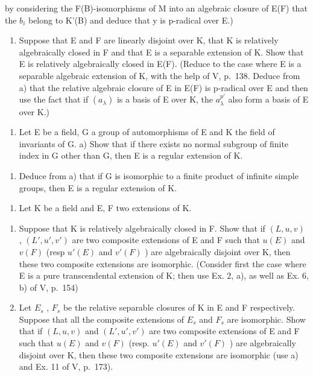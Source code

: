 by considering the F(B)-isomorphisms of M into an algebraic closure of E(F) that the \(b_{i}\) belong to K'(B) and deduce that y is p-radical over E.)

\begin{enumerate}
\def\labelenumi{\alph{enumi})}
\setcounter{enumi}{1}
\tightlist
\item
  Suppose that E and F are linearly disjoint over K, that K is relatively algebraically closed in F and that E is a separable extension of K. Show that E is relatively algebraically closed in E(F). (Reduce to the case where E is a separable algebraic extension of K, with the help of V, p.~138. Deduce from a) that the relative algebraic closure of E in E(F) is p-radical over E and then use the fact that if \((a_{\lambda})\) is a basis of E over K, the \(a_{\lambda}^{p'}\) also form a basis of E over K.)
\end{enumerate}

\begin{enumerate}
\def\labelenumi{\arabic{enumi})}
\setcounter{enumi}{2}
\tightlist
\item
  Let E be a field, G a group of automorphisms of E and K the field of invariants of G. a) Show that if there exists no normal subgroup of finite index in G other than G, then E is a regular extension of K.
\end{enumerate}

\begin{enumerate}
\def\labelenumi{\alph{enumi})}
\setcounter{enumi}{1}
\tightlist
\item
  Deduce from a) that if G is isomorphic to a finite product of infinite simple groups, then E is a regular extension of K.
\end{enumerate}

\begin{enumerate}
\def\labelenumi{\arabic{enumi})}
\setcounter{enumi}{3}
\tightlist
\item
  Let K be a field and E, F two extensions of K.
\end{enumerate}

\begin{enumerate}
\def\labelenumi{\alph{enumi})}
\item
  Suppose that K is relatively algebraically closed in F. Show that if \((L, u, v)\) , \((L', u', v')\) are two composite extensions of E and F such that \(u(E)\) and \(v(F)\) (resp \(u'(E)\) and \(v'(F)\) ) are algebraically disjoint over K, then these two composite extensions are isomorphic. (Consider first the case where E is a pure transcendental extension of K; then use Ex. 2, a), as well as Ex. 6, b) of V, p.~154)
\item
  Let \(E_{s}\) , \(F_{s}\) be the relative separable closures of K in E and F respectively. Suppose that all the composite extensions of \(E_{s}\) and \(F_{s}\) are isomorphic. Show that if \((L, u, v)\) and \((L', u', v')\) are two composite extensions of E and F such that \(u(E)\) and \(v(F)\) (resp. \(u'(E)\) and \(v'(F)\) ) are algebraically disjoint over K, then these two composite extensions are isomorphic (use a) and Ex. 11 of V, p.~173).
\end{enumerate}

